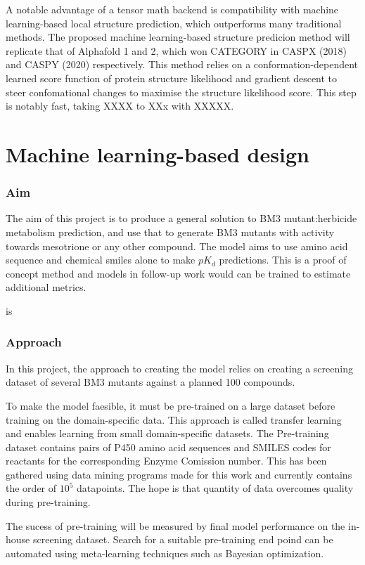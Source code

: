 \documentclass{article}
\begin{document}
A notable advantage of a tensor math backend is compatibility with machine learning-based local structure prediction, which outperforms many traditional methods. The proposed machine learning-based structure predicion method will replicate that of Alphafold 1 and 2, which won CATEGORY in CASPX (2018) and CASPY (2020) respectively. This method relies on a conformation-dependent learned score function of protein structure likelihood and gradient descent to steer confomational changes to maximise the structure likelihood score. This step is notably fast, taking XXXX to XXx with XXXXX. %
\par

\section{Machine learning-based design}

\subsubsection{Aim}
The aim of this project is to produce a general solution to BM3 mutant:herbicide metabolism prediction, and use that to generate BM3 mutants with activity towards mesotrione or any other compound. The model aims to use amino acid sequence and chemical smiles alone to make $pK_d$ predictions. %
This is a proof of concept method and models in follow-up work would can be trained to estimate additional metrics. %
\par
\cite{MONN:m} is%

\subsubsection{Approach}
In this project, the approach to creating the model relies on creating a screening dataset of several BM3 mutants against a planned 100 compounds. %
\par
To make the model faesible, it must be pre-trained on a large dataset before training on the domain-specific data. This approach is called transfer learning and enables learning from small domain-specific datasets. The Pre-training dataset contains  pairs of P450 amino acid sequences and SMILES codes for reactants for the corresponding Enzyme Comission number. This has been gathered using data mining programs made for this work and currently contains the order of $10^5$ datapoints. The hope is that quantity of data overcomes quality during pre-training. %
\par
The sucess of pre-training will be measured by final model performance on the in-house screening dataset. Search for a suitable pre-training end poind can be automated using meta-learning techniques such as Bayesian optimization. %
\end{document}
